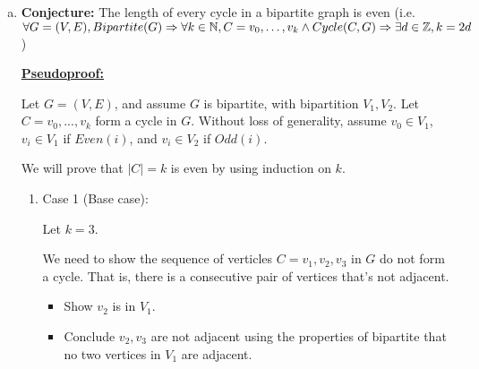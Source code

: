 \documentclass[12pt]{article}
\begin{document}
\begin{enumerate}[a.]
    \item

    \textbf{Conjecture:} The length of every cycle in a bipartite graph is even
    (i.e. $\forall G = (V,E),\\ Bipartite(G) \Rightarrow \forall k \in \mathbb{N}, C = v_0,\dots,v_k \land Cycle(C,G) \Rightarrow \exists d \in \mathbb{Z}, k = 2d$)

    \bigskip

    \begin{mdframed}
        \underline{\textbf{Pseudoproof:}}

        \bigskip

        Let $G = (V,E)$, and assume $G$ is bipartite, with bipartition $V_1,V_2$.
        Let $C = v_0,...,v_k$ form a cycle in $G$. Without loss of generality,
        assume $v_0 \in V_1$, $v_i \in V_1$ if $Even(i)$, and $v_i \in V_2$ if $Odd(i)$.

        \bigskip

        We will prove that $|C| = k$ is even by using induction on $k$.

        \bigskip

        \begin{enumerate}[1.]
            \item Case 1 (Base case):

            \bigskip

            Let $k = 3$.

            \bigskip

            We need to show the sequence of verticles $C=v_1,v_2,v_3$ in $G$ do not
            form a cycle. That is, there is a consecutive pair of vertices that's not
            adjacent.

            \bigskip

            \begin{itemize}
                \item Show $v_2$ is in $V_1$.

                \begin{mdframed}

                \end{mdframed}

                \item Conclude $v_2,v_3$ are not adjacent using the properties of bipartite
                that no two vertices in $V_1$ are adjacent.
            \end{itemize}

            \bigskip


\end{enumerate}
\end{mdframed}
\end{enumerate}
\end{document}

